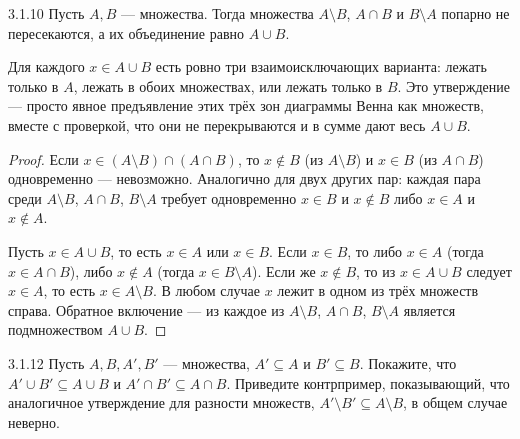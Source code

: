 \begin{exercise}{3.1.10}{}
Пусть $A,B$ — множества. Тогда множества $A \setminus B$, $A \cap B$ и $B \setminus A$
попарно не пересекаются, а их объединение равно $A \cup B$.
\end{exercise}

\begin{intuition}
Для каждого $x \in A \cup B$ есть ровно три взаимоисключающих варианта: лежать только в $A$,
лежать в обоих множествах, или лежать только в $B$. Это утверждение — просто явное
предъявление этих трёх зон диаграммы Венна как множеств, вместе с проверкой, что они не
перекрываются и в сумме дают весь $A \cup B$.

\begin{center}
\end{center}
\end{intuition}

\begin{proof}
 Если $x \in (A \setminus B) \cap (A \cap B)$, то
$x \notin B$ (из $A \setminus B$) и $x \in B$ (из $A \cap B$) одновременно — невозможно.
Аналогично для двух других пар: каждая пара среди $A \setminus B$, $A \cap B$,
$B \setminus A$ требует одновременно $x \in B$ и $x \notin B$ либо $x \in A$ и
$x \notin A$.

 Пусть $x \in A \cup B$, то есть $x \in A$ или $x \in B$. Если
$x \in B$, то либо $x \in A$ (тогда $x \in A \cap B$), либо $x \notin A$ (тогда
$x \in B \setminus A$). Если же $x \notin B$, то из $x \in A \cup B$ следует $x \in A$, то
есть $x \in A \setminus B$. В любом случае $x$ лежит в одном из трёх множеств справа.
Обратное включение — из  каждое из $A \setminus B$,
$A \cap B$, $B \setminus A$ является подмножеством $A \cup B$.
\end{proof}

\begin{exercise}{3.1.12}{}
Пусть $A,B,A',B'$ — множества, $A' \subseteq A$ и $B' \subseteq B$. Покажите, что
$A' \cup B' \subseteq A \cup B$ и $A' \cap B' \subseteq A \cap B$. Приведите контрпример,
показывающий, что аналогичное утверждение для разности множеств,
$A' \setminus B' \subseteq A \setminus B$, в общем случае неверно.
\end{exercise}

